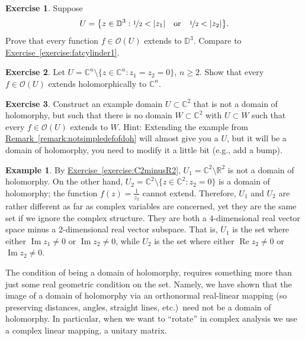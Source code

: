 \documentclass[12pt,openany]{book}
\newcommand{\avoidbreak}{\postdisplaypenalty=100}
\renewcommand{\Re}{\operatorname{Re}}
\renewcommand{\Im}{\operatorname{Im}}
\newcommand{\sabs}[1]{\lvert {#1} \rvert}
\newcommand{\C}{{\mathbb{C}}}
\newcommand{\R}{{\mathbb{R}}}
\newcommand{\D}{{\mathbb{D}}}
\newcommand{\sO}{{\mathscr{O}}}
\theoremstyle{plain}
\theoremstyle{remark}
\theoremstyle{definition}
\newenvironment{exbox}{%
    \def\FrameCommand{\vrule width 1pt \relax\hspace{10pt}}%
    \MakeFramed{\advance\hsize-\width\FrameRestore}%
}{%
    \endMakeFramed
}
\theoremstyle{exercise}
\newtheorem{exercise}{Exercise}[section]
\theoremstyle{example}
\newtheorem{example}[thm]{Example}
\newcommand{\exerciseref}[1]{\hyperref[#1]{Exercise~\ref*{#1}}}
\newcommand{\remarkref}[1]{\hyperref[#1]{Remark~\ref*{#1}}}
\begin{document}
\begin{exbox}
\begin{exercise} \label{exercise:fatcylinder2}
Suppose
\begin{equation*}
U = \bigl\{ z \in \D^3 :
\nicefrac{1}{2} < \sabs{z_1} \quad\text{or}\quad
\nicefrac{1}{2} < \sabs{z_2} \bigr\} .
\avoidbreak
\end{equation*}
Prove that every function $f \in \sO(U)$ extends to $\D^3$.
Compare to \exerciseref{exercise:fatcylinder1}.
\end{exercise}

\begin{exercise} \label{exercise:codim2extends}
Let $U = \C^n \setminus \{ z \in \C^n : z_1 = z_2 = 0 \}$, $n
\geq 2$.  Show that every $f \in \sO(U)$ extends holomorphically to
$\C^n$.
\end{exercise}


\begin{exercise} \label{exercise:notsimpledefofdoh}
Construct an example domain $U \subset \C^2$ that is not a domain of
holomorphy, but such that there is no domain $W \subset \C^2$ with $U
\subset W$ such that every $f \in \sO(U)$ extends to $W$.
Hint: Extending the example from \remarkref{remark:notsimpledefofdoh} will
almost give you a $U$, but it will be a domain of holomorphy, you need to modify it
a little bit (e.g., add a bump).
\end{exercise}
\end{exbox}

\begin{example}
By
\exerciseref{exercise:C2minusR2},
$U_1 = \C^2 \setminus \R^2$
is not a domain of holomorphy.  On the other hand,
$U_2 = \C^2 \setminus \{ z \in \C^2 : z_2 = 0 \}$ is a domain of holomorphy;
the function $f(z) = \frac{1}{z_2}$ cannot extend.
Therefore, $U_1$ and $U_2$ are rather different as far as complex variables are
concerned, yet they are the same set if we ignore the complex structure.
They are both a $4$-dimensional real vector space minus a $2$-dimensional
real vector subspace.  That is, $U_1$ is the set
where either $\Im z_1 \neq 0$ or $\Im z_2 \neq 0$,
while $U_2$ is the set
where either $\Re z_2 \neq 0$ or $\Im z_2 \neq 0$.

The condition of being a domain of holomorphy,
requires something more than just some real geometric condition on the
set.  Namely, we have shown that the image of a domain of holomorphy
via an orthonormal real-linear mapping
(so preserving distances, angles, straight lines,
etc.)\ need not be a domain of holomorphy.  In particular, when we want to
``rotate'' in complex analysis we use a complex linear mapping,
a unitary matrix.
\end{example}
\end{document}
